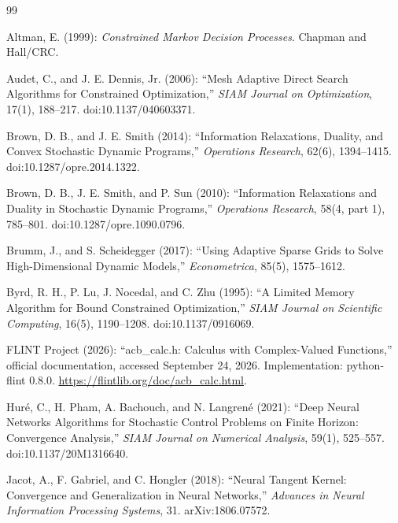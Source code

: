 \begin{thebibliography}{99}

Altman, E. (1999): \emph{Constrained Markov Decision Processes}. Chapman and Hall/CRC.

Audet, C., and J. E. Dennis, Jr. (2006): ``Mesh Adaptive Direct Search Algorithms for Constrained Optimization,'' \emph{SIAM Journal on Optimization}, 17(1), 188--217. doi:10.1137/040603371.


Brown, D. B., and J. E. Smith (2014): ``Information Relaxations, Duality, and Convex Stochastic Dynamic Programs,'' \emph{Operations Research}, 62(6), 1394--1415. doi:10.1287/opre.2014.1322.


Brown, D. B., J. E. Smith, and P. Sun (2010): ``Information Relaxations and Duality in Stochastic Dynamic Programs,'' \emph{Operations Research}, 58(4, part 1), 785--801. doi:10.1287/opre.1090.0796.


Brumm, J., and S. Scheidegger (2017): ``Using Adaptive Sparse Grids to Solve High-Dimensional Dynamic Models,'' \emph{Econometrica}, 85(5), 1575--1612.


Byrd, R. H., P. Lu, J. Nocedal, and C. Zhu (1995): ``A Limited Memory Algorithm for Bound Constrained Optimization,'' \emph{SIAM Journal on Scientific Computing}, 16(5), 1190--1208. doi:10.1137/0916069.


FLINT Project (2026): ``acb\_calc.h: Calculus with Complex-Valued Functions,'' official documentation, accessed September 24, 2026. Implementation: python-flint 0.8.0. \url{https://flintlib.org/doc/acb_calc.html}.

Hur\'e, C., H. Pham, A. Bachouch, and N. Langren\'e (2021): ``Deep Neural Networks Algorithms for Stochastic Control Problems on Finite Horizon: Convergence Analysis,'' \emph{SIAM Journal on Numerical Analysis}, 59(1), 525--557. doi:10.1137/20M1316640.


Jacot, A., F. Gabriel, and C. Hongler (2018): ``Neural Tangent Kernel: Convergence and Generalization in Neural Networks,'' \emph{Advances in Neural Information Processing Systems}, 31. arXiv:1806.07572.



\end{thebibliography}
